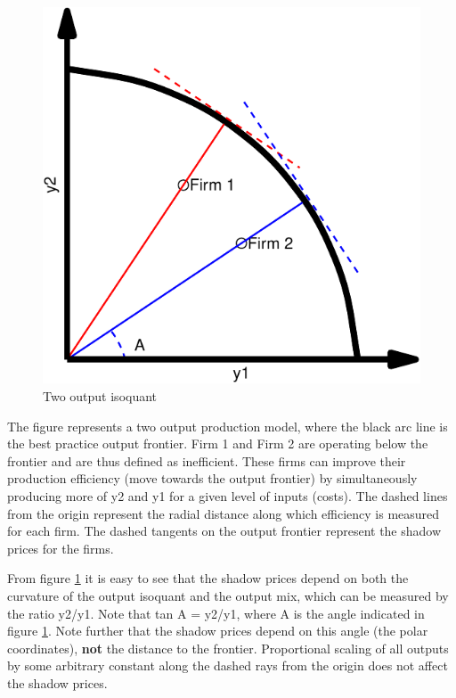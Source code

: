 \documentclass[
  12pt,
]{article}
\begin{document}
\begin{figure}[H]

{\centering \includegraphics[width=0.7\linewidth]{lurking_co2_files/figure-latex/isoquant-1} 

}

\caption{ Two output isoquant}\label{fig:isoquant}
\end{figure}

\begin{footnotesize} 
The figure represents a two output production model, where the black arc line is the best practice output frontier. Firm 1 and Firm 2 are operating below the frontier and are thus defined as inefficient. These firms can improve their production efficiency (move towards the output frontier) by simultaneously producing more of y2 and y1 for a given level of inputs (costs). The dashed lines from the origin represent the radial distance along which efficiency is measured for each firm.  The dashed tangents on the output frontier represent the shadow prices for the firms.
\end{footnotesize}

From figure \ref{fig:isoquant} it is easy to see that the shadow prices depend on both the curvature of the output isoquant and the output mix, which can be measured by the ratio y2/y1. Note that tan A = y2/y1, where A is the angle indicated in figure \ref{fig:isoquant}. Note further that the shadow prices depend on this angle (the polar coordinates), \textbf{not} the distance to the frontier. Proportional scaling of all outputs by some arbitrary constant along the dashed rays from the origin does not affect the shadow prices.
\end{document}
